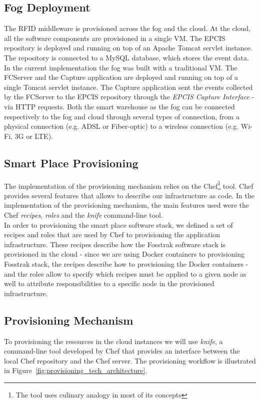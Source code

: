\subsection{Fog Deployment}
\label{sub:imp_smart_warehouse_fog}
The \gls{RFID} middleware is provisioned across the fog and the cloud. At the cloud,
all the software components are provisioned in a single \gls{VM}. The \gls{EPCIS} repository is deployed
and running on top of an Apache Tomcat servlet instance. The repository is connected to a MySQL
database, which stores the event data. In the current implementation the fog was built with a traditional
\gls{VM}. The \gls{FCServer} and the Capture application are deployed and running on top of a single
Tomcat servlet instance. The Capture application sent the events collected by the \gls{FCServer} to
the \gls{EPCIS} repository through the \textit{\gls{EPCIS} Capture Interface} - via \gls{HTTP} requests.
Both the smart warehouse as the fog can be connected respectively to the fog and cloud through several
types of connection, from a physical connection (e.g. \gls{ADSL} or Fiber-optic) to a wireless connection
(e.g. Wi-Fi, 3G or \gls{LTE}).

\subsection{Smart Place Provisioning}
\label{sec:impl_provisioning}
The implementation of the provisioning mechanism relies on the Chef\footnote{The tool uses culinary
analogy in most of its concepts} tool. Chef provides several features that allows to describe our
infrastructure as code. In the implementation of the provisioning mechanism, the main features used
were the Chef \textit{recipes}, \textit{roles} and the \textit{knife} command-line tool.\\

In order to provisioning the smart place software stack, we defined a set of recipes and roles that
are used by Chef to provisioning the application infrastructure. These recipes describe how the
Fosstrak software stack is provisioned in the cloud - since we are using Docker containers to
provisioning Fosstrak stack, the recipes describe how to provisioning the Docker containers -
and the roles allow to specify which recipes must be applied to a given node as well to
attribute responsibilities to a specific node in the provisioned infrastructure.

\subsection{Provisioning Mechanism}
\label{subs:provisioning_mechanism}
To provisioning the resources in the cloud instances we will use \textit{knife}, a command-line tool
developed by Chef that provides an interface between the local Chef repository and the Chef server.
The provisioning workflow is illustrated in Figure~\ref{fig:provisioning_tech_architecture}.\\

